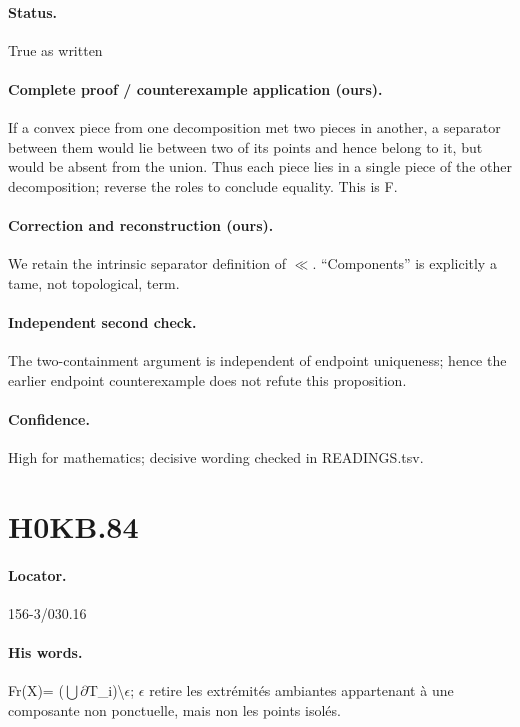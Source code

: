\paragraph{Status.} True as written

\paragraph{Complete proof / counterexample application (ours).} If a convex piece from one decomposition met two pieces in another, a separator between them would lie between two of its points and hence belong to it, but would be absent from the union. Thus each piece lies in a single piece of the other decomposition; reverse the roles to conclude equality. This is F.

\paragraph{Correction and reconstruction (ours).} We retain the intrinsic separator definition of \ensuremath{\ll}. “Components” is explicitly a tame, not topological, term.

\paragraph{Independent second check.} The two-containment argument is independent of endpoint uniqueness; hence the earlier endpoint counterexample does not refute this proposition.

\paragraph{Confidence.} High for mathematics; decisive wording checked in READINGS.tsv.

\section*{H0KB.84}\label{statement:H0KB.84}
\paragraph{Locator.} 156-3/030.16

\paragraph{His words.} Fr(X)= (\ensuremath{\bigcup}\ensuremath{\partial}T\_i)\textbackslash{}\ensuremath{\epsilon}; \ensuremath{\epsilon} retire les extrémités ambiantes appartenant à une composante non ponctuelle, mais non les points isolés.

